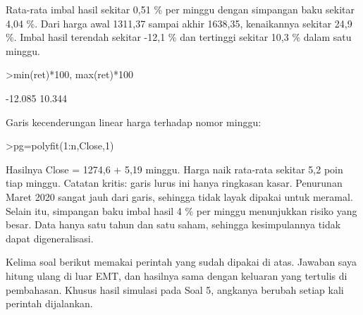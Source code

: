 \documentclass[a4paper,10pt]{article}
\begin{document}
\begin{eulernotebook}
\begin{eulercomment}
\begin{eulercomment}
\begin{eulercomment}
\begin{eulercomment}
\begin{eulercomment}
\begin{eulercomment}
\begin{eulercomment}
\begin{eulercomment}
\begin{eulercomment}
\begin{eulercomment}
\begin{eulercomment}
\begin{eulercomment}
\begin{eulercomment}
\begin{eulercomment}
\begin{eulercomment}
\begin{eulercomment}
\begin{eulercomment}
\begin{eulercomment}
\begin{eulercomment}
\begin{eulercomment}
\begin{eulercomment}
\begin{eulercomment}
\begin{eulercomment}
\begin{eulercomment}
\begin{eulercomment}
\begin{eulercomment}
\begin{eulercomment}
\begin{eulercomment}
\begin{eulercomment}
Rata-rata imbal hasil sekitar 0,51 \% per minggu dengan simpangan baku sekitar 4,04 \%. Dari
harga awal 1311,37 sampai akhir 1638,35, kenaikannya sekitar 24,9 \%. Imbal hasil terendah
sekitar -12,1 \% dan tertinggi sekitar 10,3 \% dalam satu minggu.
\end{eulercomment}
\begin{eulerprompt}
>min(ret)*100, max(ret)*100
\end{eulerprompt}
\begin{euleroutput}
  -12.085
  10.344
\end{euleroutput}
\begin{eulercomment}
Garis kecenderungan linear harga terhadap nomor minggu:
\end{eulercomment}
\begin{eulerprompt}
>pg=polyfit(1:n,Close,1)
\end{eulerprompt}
\begin{euleroutput}
  [1274.6,  5.1887]
\end{euleroutput}
\begin{eulercomment}
Hasilnya Close = 1274,6 + 5,19 minggu. Harga naik rata-rata sekitar 5,2 poin tiap minggu.
Catatan kritis: garis lurus ini hanya ringkasan kasar. Penurunan Maret 2020 sangat jauh dari
garis, sehingga tidak layak dipakai untuk meramal. Selain itu, simpangan baku imbal hasil 4 \%
per minggu menunjukkan risiko yang besar. Data hanya satu tahun dan satu saham, sehingga
kesimpulannya tidak dapat digeneralisasi.

\begin{eulercomment}
\begin{eulercomment}
Kelima soal berikut memakai perintah yang sudah dipakai di atas. Jawaban saya hitung ulang di
luar EMT, dan hasilnya sama dengan keluaran yang tertulis di pembahasan. Khusus hasil
simulasi pada Soal 5, angkanya berubah setiap kali perintah dijalankan.


\end{eulercomment}
\end{eulercomment}
\end{eulercomment}
\end{eulercomment}
\end{eulercomment}
\end{eulercomment}
\end{eulercomment}
\end{eulercomment}
\end{eulercomment}
\end{eulercomment}
\end{eulercomment}
\end{eulercomment}
\end{eulercomment}
\end{eulercomment}
\end{eulercomment}
\end{eulercomment}
\end{eulercomment}
\end{eulercomment}
\end{eulercomment}
\end{eulercomment}
\end{eulercomment}
\end{eulercomment}
\end{eulercomment}
\end{eulercomment}
\end{eulercomment}
\end{eulercomment}
\end{eulercomment}
\end{eulercomment}
\end{eulercomment}
\end{eulercomment}
\end{eulercomment}
\end{eulernotebook}
\end{document}
